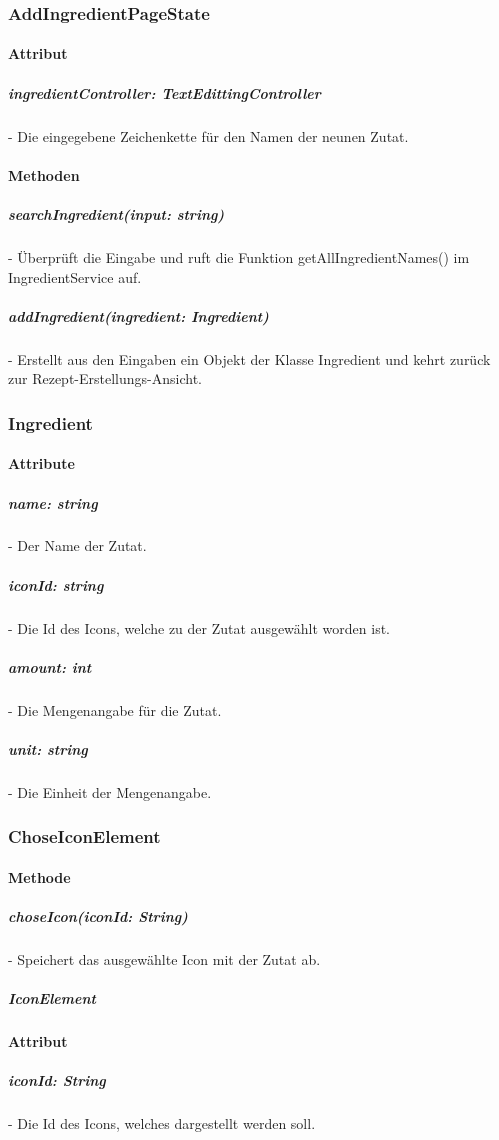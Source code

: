 \documentclass[parskip=full]{scrartcl}
\begin{document}
        \subsubsection{AddIngredientPageState}
            \paragraph*{Attribut}
                \subparagraph*{ingredientController: TextEdittingController} - Die eingegebene Zeichenkette für den Namen der neunen Zutat.
    
            \paragraph*{Methoden}
                \subparagraph*{searchIngredient(input: string)} - Überprüft die Eingabe und ruft die Funktion getAllIngredientNames() im IngredientService auf.
                \subparagraph*{addIngredient(ingredient: Ingredient)} -  Erstellt aus den Eingaben ein Objekt der Klasse Ingredient und kehrt zurück zur Rezept-Erstellungs-Ansicht.
        
        \subsubsection*{Ingredient}
            \paragraph*{Attribute}
                \subparagraph*{name: string} - Der Name der Zutat.
                \subparagraph*{iconId: string} - Die Id des Icons, welche zu der Zutat ausgewählt worden ist.
                \subparagraph*{amount: int} - Die Mengenangabe für die Zutat.
                \subparagraph*{unit: string} - Die Einheit der Mengenangabe.

        \subsubsection*{ChoseIconElement}
            \paragraph*{Methode}
                \subparagraph*{choseIcon(iconId: String)} - Speichert das ausgewählte Icon mit der Zutat ab.

        \subparagraph*{IconElement}
            \paragraph*{Attribut}
                \subparagraph*{iconId: String} - Die Id des Icons, welches dargestellt werden soll.
        
\end{document}
